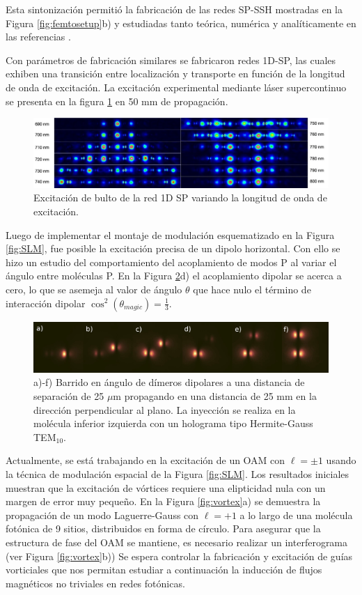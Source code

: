 \documentclass{article}
\begin{document}
Esta sintonización permitió la fabricación de las redes SP-SSH mostradas en la Figura \ref{fig:femtosetup}b) y estudiadas tanto teórica, numérica y analíticamente en las referencias \cite{toporusos, topo1dphoto, SPSSH}.

Con parámetros de fabricación similares se fabricaron redes 1D-SP, las cuales exhiben una transición entre localización y transporte en función de la longitud de onda de excitación. La excitación experimental mediante láser supercontinuo se presenta en la figura \ref{fig:super} en 50 mm de propagación.

\begin{figure}[H]
	\centering
	\includegraphics[width=1.0\linewidth]{./media/SP1D.jpg}
	\caption{Excitación de bulto de la red 1D SP variando la longitud de onda de excitación. \label{fig:super}}
\end{figure}

Luego de implementar el montaje de modulación esquematizado en la Figura \ref{fig:SLM}, fue posible la excitación precisa de un dipolo horizontal. Con ello se hizo un estudio del comportamiento del acoplamiento de modos P al variar el ángulo entre moléculas P. En la Figura \ref{fig:dipoles}d) el acoplamiento dipolar se acerca a cero, lo que se asemeja al valor de ángulo $\theta$ que hace nulo el término de interacción dipolar $\cos^2(\theta_{magic}) = \frac{1}{3}$.  

\begin{figure}[H]
	\centering
	\includegraphics[width=0.9\linewidth]{./media/dipoles.jpg}
	\caption{a)-f) Barrido en ángulo de dímeros dipolares a una distancia de separación de 25 $\mu$m propagando en una distancia de 25 mm en la dirección perpendicular al plano. La inyección se realiza en la molécula inferior izquierda con un holograma tipo Hermite-Gauss TEM$_{10}$. \label{fig:dipoles}}
\end{figure}

Actualmente, se está trabajando en la excitación de un OAM con $\ell = \pm 1$ usando la técnica de modulación espacial de la Figura \ref{fig:SLM}. Los resultados iniciales muestran que la excitación de vórtices requiere una elipticidad nula con un margen de error muy pequeño. En la Figura \ref{fig:vortex}a) se demuestra la propagación de un modo Laguerre-Gauss con $\ell = +1$ a lo largo de una molécula fotónica de 9 sitios, distribuidos en forma de círculo. Para asegurar que la estructura de fase del OAM se mantiene, es necesario realizar un interferograma (ver Figura \ref{fig:vortex}b)) Se espera controlar la fabricación y excitación de guías vorticiales que nos permitan estudiar a continuación la inducción de flujos magnéticos no triviales en redes fotónicas.
\end{document}

